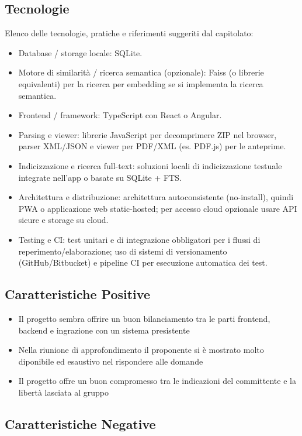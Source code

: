 \documentclass[a4paper,12pt]{article}
\begin{document}
    \subsection{Tecnologie}
    Elenco delle tecnologie, pratiche e riferimenti suggeriti dal capitolato:
    \begin{itemize}
        \item Database / storage locale: SQLite. 
        \item Motore di similarità / ricerca semantica (opzionale): Faiss (o librerie equivalenti) per la ricerca per embedding se si implementa la ricerca semantica. 
        \item Frontend / framework: TypeScript con React o Angular. 
        \item Parsing e viewer: librerie JavaScript per decomprimere ZIP nel browser, parser XML/JSON e viewer per PDF/XML (es. PDF.js) per le anteprime. 
        \item Indicizzazione e ricerca full-text: soluzioni locali di indicizzazione testuale integrate nell’app o basate su SQLite + FTS. 
        \item Architettura e distribuzione: architettura autoconsistente (no-install), quindi PWA o applicazione web static-hosted; per accesso cloud opzionale usare API sicure e storage su cloud. 
        \item Testing e CI: test unitari e di integrazione obbligatori per i flussi di reperimento/elaborazione; uso di sistemi di versionamento (GitHub/Bitbucket) e pipeline CI per esecuzione automatica dei test. 
    \end{itemize}

    \subsection{Caratteristiche Positive}
    \begin{itemize}
        \item Il progetto sembra offrire un buon bilanciamento tra le parti frontend, backend e ingrazione con un sistema presistente 
        \item Nella riunione di approfondimento il proponente si è mostrato molto diponibile ed esaustivo nel rispondere alle domande
        \item Il progetto offre un buon compromesso tra le indicazioni del committente e la libertà lasciata al gruppo
    \end{itemize}
    \subsection{Caratteristiche Negative}
\end{document}

